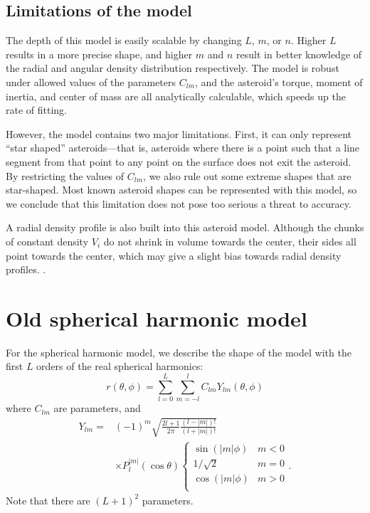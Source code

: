 \documentclass[aps,twocolumn,secnumarabic,balancelastpage,amsmath,amssymb,nofootinbib,floatfix]{revtex4-1}
\begin{document}
\subsection{Limitations of the model}
The depth of this model is easily scalable by changing $L$, $m$, or $n$. Higher $L$ results in a more precise shape, and higher $m$ and $n$ result in better knowledge of the radial and angular density distribution respectively. The model is robust under allowed values of the parameters $C_{lm}$, and the asteroid's torque, moment of inertia, and center of mass are all analytically calculable, which speeds up the rate of fitting.

However, the model contains two major limitations. First, it can only represent ``star shaped'' asteroids---that is, asteroids where there is a point such that a line segment from that point to any point on the surface does not exit the asteroid. By restricting the values of $C_{lm}$, we also rule out some extreme shapes that are star-shaped. Most known asteroid shapes can be represented with this model, so we conclude that this limitation does not pose too serious a threat to accuracy. 

A radial density profile is also built into this asteroid model. Although the chunks of constant density $V_i$ do not shrink in volume towards the center, their sides all point towards the center, which may give a slight bias towards radial density profiles. .


\newpage 

\section{Old spherical harmonic model}
For the spherical harmonic model, we describe the shape of the model with the first $L$ orders of the real spherical harmonics:
\begin{equation}
    r(\theta, \phi) = \sum_{l=0}^L\sum_{m=-l}^l C_{lm} Y_{lm}(\theta, \phi)
    \label{eqn:sph-surface}
\end{equation}
where $C_{lm}$ are parameters, and 
\begin{equation}
\begin{aligned}
    Y_{lm} = &(-1)^m\sqrt{\frac{2l + 1}{2\pi}\frac{(l-|m|)!}{(l+|m|)!}}\\
    &\times P_l^{|m|}(\cos\theta)\begin{cases}
        \sin(|m|\phi)& m < 0\\
        1/\sqrt{2}& m = 0\\
        \cos(|m|\phi)& m > 0\\
    \end{cases}.
    \label{eqn:spherical-harmonics}
\end{aligned}
\end{equation}
Note that there are $(L+1)^2$ parameters.
\end{document}
